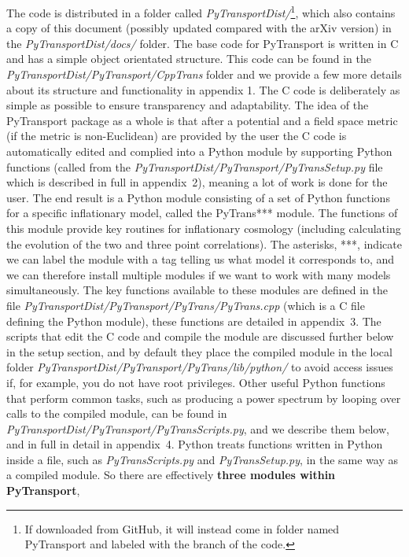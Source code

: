 \documentclass[10pt,
amsmath,amssymb,
aps,prd,nofootinbib,eqsecnum,a4paper]{revtex4}
\newcommand{\CC}{C\nolinebreak\hspace{-.05em}\raisebox{.4ex}{\tiny\bf +}\nolinebreak\hspace{-.10em}\raisebox{.4ex}{\tiny\bf +}}
\def\CC{{C\nolinebreak[4]\hspace{-.05em}\raisebox{.4ex}{\tiny\bf ++}}}
\def\S{ }
\begin{document}
The code is distributed in a folder called {\it PyTransportDist/}\footnote{If downloaded from GitHub, it will instead come in folder named PyTransport and labeled with the branch of the code.}, which also contains a copy of this document (possibly updated compared with the arXiv version) in the 
{\it PyTransportDist/docs/} folder. The base code for PyTransport is written in \CC \S  and has a simple object orientated structure. This code can be found 
in the {\it PyTransportDist/PyTransport/CppTrans} folder and we provide a few more details about its structure 
and functionality in  appendix 1. 
The \CC \S code is deliberately as simple as possible to ensure transparency 
and adaptability. The idea of the PyTransport package as a 
whole is that after a potential and a field space metric (if the metric is non-Euclidean) are provided by the user 
the \CC \S  code is automatically edited and complied into a Python module by supporting 
Python functions (called from the {\it PyTransportDist/PyTransport/PyTransSetup.py} file which is described in full 
in appendix~2), 
meaning a lot of work is done for the user.  
The end result is a Python module consisting of a set of Python functions for a specific inflationary model, called the 
PyTrans*** module. 
The functions of this module provide key routines for inflationary cosmology (including calculating the evolution of the two and 
three point correlations). The asterisks, ***, indicate we can label the module with a tag telling us what model it 
corresponds to, and we can 
therefore install multiple modules if we want to work with many models simultaneously. The 
key functions available to these modules 
are defined in the file {\it PyTransportDist/PyTransport/PyTrans/PyTrans.cpp} (which is a \CC \S  file defining the
 Python module), these functions are detailed in appendix~3.
The scripts  that edit the \CC \S code and compile the module are discussed further below in the setup section, 
and by default they place the compiled module in the local folder 
{\it PyTransportDist/PyTransport/PyTrans/lib/python/} to avoid access issues if, for example, you do not have root privileges. 
Other useful Python functions that perform common tasks, such as producing a power spectrum by looping 
over calls to the compiled module, can be 
found in {\it PyTransportDist/PyTransport/PyTransScripts.py}, and we describe them below, and in full in detail in appendix~4. 
Python 
treats functions written in Python inside a file, such as {\it PyTransScripts.py} and {\it PyTransSetup.py}, 
in the same way as a compiled module. 
So there are effectively {\bf three modules within PyTransport}, 
\end{document}
